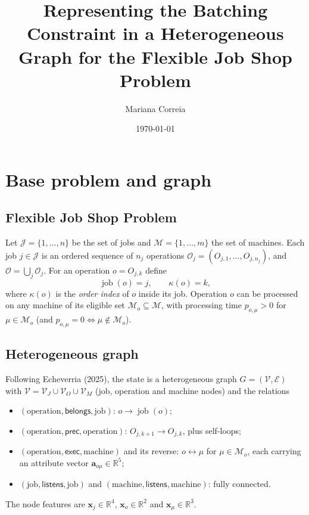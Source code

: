 \documentclass[11pt,a4paper]{article}
\title{Representing the Batching Constraint in a Heterogeneous\\
Graph for the Flexible Job Shop Problem}
\author{Mariana Correia}
\date{\today}
\newcommand{\Jset}{\mathcal{J}}
\newcommand{\Oset}{\mathcal{O}}
\newcommand{\Mset}{\mathcal{M}}
\newcommand{\Eset}{\mathcal{E}}
\newcommand{\Vset}{\mathcal{V}}
\newcommand{\job}{\operatorname{job}}
\newcommand{\R}{\mathbb{R}}
\begin{document}
\maketitle

\section{Base problem and graph}
\label{sec:base}

\subsection{Flexible Job Shop Problem}
Let $\Jset=\{1,\dots,n\}$ be the set of jobs and $\Mset=\{1,\dots,m\}$ the set of
machines. Each job $j\in\Jset$ is an ordered sequence of $n_j$ operations
$\Oset_j=(O_{j,1},\dots,O_{j,n_j})$, and $\Oset=\bigcup_{j}\Oset_j$.
For an operation $o=O_{j,k}$ define
\begin{equation}
  \job(o)=j, \qquad \kappa(o)=k,
\end{equation}
where $\kappa(o)$ is the \emph{order index} of $o$ inside its job.
Operation $o$ can be processed on any machine of its eligible set
$\Mset_o\subseteq\Mset$, with processing time $p_{o,\mu}>0$ for $\mu\in\Mset_o$
(and $p_{o,\mu}=0 \Leftrightarrow \mu\notin\Mset_o$).

\subsection{Heterogeneous graph}
Following Echeverria (2025), the state is a heterogeneous graph
$G=(\Vset,\Eset)$ with
$\Vset=\Vset_J\cup\Vset_O\cup\Vset_M$ (job, operation and machine nodes) and the
relations
\begin{itemize}
  \item $(\text{operation},\textsf{belongs},\text{job})$: $o\to\job(o)$;
  \item $(\text{operation},\textsf{prec},\text{operation})$: $O_{j,k+1}\to O_{j,k}$, plus self-loops;
  \item $(\text{operation},\textsf{exec},\text{machine})$ and its reverse: $o\leftrightarrow\mu$ for $\mu\in\Mset_o$, each carrying an attribute vector $\mathbf{a}_{o\mu}\in\R^5$;
  \item $(\text{job},\textsf{listens},\text{job})$ and $(\text{machine},\textsf{listens},\text{machine})$: fully connected.
\end{itemize}
The node features are $\mathbf{x}_j\in\R^4$, $\mathbf{x}_o\in\R^2$ and $\mathbf{x}_\mu\in\R^3$.
\end{document}
